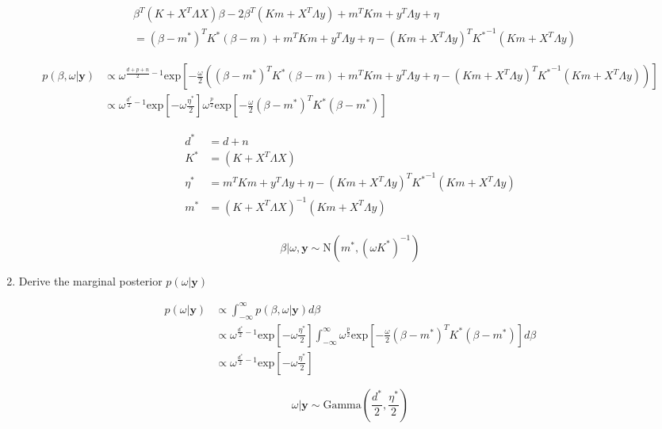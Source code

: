 \documentclass[10pt]{article}
\newcommand{\by}{\mathbf{y}}
\begin{document}
\begin{enumerate}[label=(\Alph*)]
      \begin{align*}
        &\beta^T ( K+ X^T \Lambda X) \beta - 2 \beta^T (K m + X^T \Lambda y) + m^TKm + y^T\Lambda y + \eta \\
        &= (\beta - m^*)^T K^* (\beta - m) + m^T K m + y^T \Lambda y + \eta - (K m + X^T \Lambda y)^T  {K^*}^{-1} (K m + X^T \Lambda y)
      \end{align*}

      \begin{align*}
        p(\beta, \omega | \by) &\propto \omega^{\frac{d+p+n}{2}-1} \text{exp}\left [ -\frac{\omega}{2} \left ( (\beta - m^*)^T K^* (\beta - m) + m^T K m + y^T \Lambda y + \eta - (K m + X^T \Lambda y)^T  {K^*}^{-1} (K m + X^T \Lambda y)\right)\right] \\
        &\propto \omega^{\frac{d^*}{2} - 1} \text{exp}\left[-\omega \frac{\eta^*}{2} \right]\omega^{\frac{p}{2}} \text{exp} \left[ -\frac{\omega}{2} (\beta - m^*)^T K^* (\beta - m^*) \right]
      \end{align*}

      \begin{align*}
        d^* &= d+n \\
        K^* &= ( K+ X^T \Lambda X) \\
        \eta^* &= m^T K m + y^T \Lambda y + \eta - (K m + X^T \Lambda y)^T  {K^*}^{-1} (K m + X^T \Lambda y) \\
        m^* &= (K + X^T \Lambda X)^{-1}(K m + X^T \Lambda y) \\
      \end{align*}

      $$\beta | \omega, \by \sim \text{N}\left( m^*, (\omega K^*)^{-1}\right)$$

      \item Derive the marginal posterior $p(\omega | \by)$

      \begin{align*}
        p(\omega | \by) & \propto \int_{-\infty}^{\infty} p(\beta, \omega | \by) d \beta \\
        & \propto \omega^{\frac{d^*}{2}-1} \text{exp}\left[-\omega \frac{\eta^*}{2} \right] \int_{-\infty}^{\infty} \omega^{\frac{p}{2}} \text{exp} \left[ -\frac{\omega}{2} (\beta - m^*)^T K^* (\beta - m^*) \right] d \beta\\
        & \propto \omega^{\frac{d^*}{2}-1} \text{exp}\left[-\omega \frac{\eta^*}{2} \right]
      \end{align*}

      $$\omega | \by \sim \text{Gamma}\left ( \frac{d^*}{2}, \frac{\eta^*}{2}\right)$$


\end{enumerate}
\end{document}
